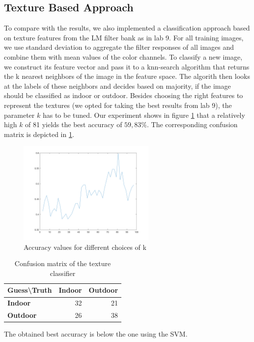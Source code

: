 \subsection{Texture Based Approach}

To compare with the results, we also implemented a classification approach based on texture features from the LM filter bank as in lab 9. For all training images, we use standard deviation to aggregate the filter responses of all images and combine them with mean values of the color channels. To classify a new image, we construct its feature vector and pass it to a knn-search algorithm that returns the k nearest neighbors of the image in the feature space. The algorith then looks at the labels of these neighbors and decides based on majority, if the image should be classified as indoor or outdoor. Besides choosing the right features to represent the textures (we opted for taking the best results from lab 9), the parameter $k$ has to be tuned. Our experiment shows in figure \ref{fig:kparam} that a relatively high $k$ of 81 yields the best accuracy of $59,83\%$. The corresponding confusion matrix is depicted in \ref{tab:confusion-matrix2}.

\begin{figure}[htb]
\centering
\includegraphics[width=0.6\textwidth]{./img/ex2/k-param}
\caption{Accuracy values for different choices of k}
\label{fig:kparam}
\end{figure}

\begin{table}[htb]
\centering
\begin{tabular}{l|rr}
\textbf{Guess{\textbackslash}Truth} & \textbf{Indoor} & \textbf{Outdoor} \\ \hline
\textbf{Indoor} & 32 & 21 \\
\textbf{Outdoor} & 26 & 38 \\
\end{tabular}
\caption{Confusion matrix of the texture classifier}
\label{tab:confusion-matrix2}
\end{table}

The obtained best accuracy is below the one using the SVM.
